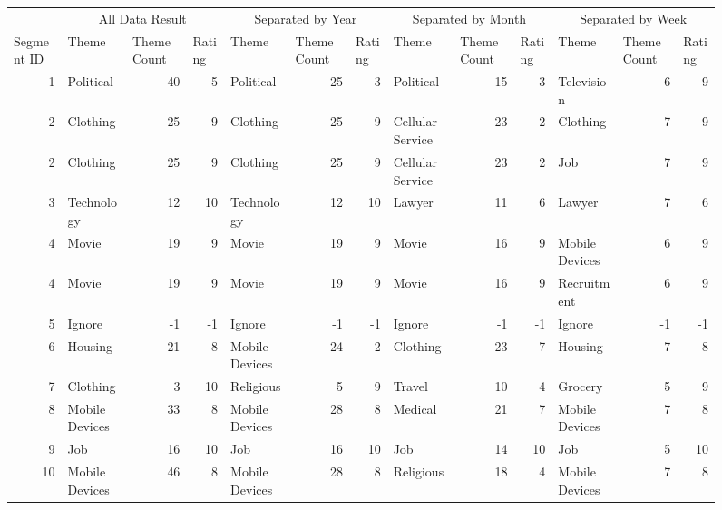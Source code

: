 \begin{figure}[htbp]
  \centering
    \begin{tabular}{rlrrlrrlrrlrr}
          & \multicolumn{3}{c}{All Data Result} & \multicolumn{3}{c}{Separated by Year} & \multicolumn{3}{c}{Separated by Month} & \multicolumn{3}{c}{Separated by Week} \\
    \multicolumn{1}{l}{Segment ID} & Theme & \multicolumn{1}{l}{Theme Count} & \multicolumn{1}{l}{Rating} & Theme & \multicolumn{1}{l}{Theme Count} & \multicolumn{1}{l}{Rating} & Theme & \multicolumn{1}{l}{Theme Count} & \multicolumn{1}{l}{Rating} & Theme & \multicolumn{1}{l}{Theme Count} & \multicolumn{1}{l}{Rating} \\
    1     & Political & 40    & 5     & Political & 25    & 3     & Political & 15    & 3     & Television & 6     & 9 \\
    2     & Clothing & 25    & 9     & Clothing & 25    & 9     & Cellular Service & 23    & 2     & Clothing & 7     & 9 \\
    2     & Clothing & 25    & 9     & Clothing & 25    & 9     & Cellular Service & 23    & 2     & Job   & 7     & 9 \\
    3     & Technology & 12    & 10    & Technology & 12    & 10    & Lawyer & 11    & 6     & Lawyer & 7     & 6 \\
    4     & Movie & 19    & 9     & Movie & 19    & 9     & Movie & 16    & 9     & Mobile Devices & 6     & 9 \\
    4     & Movie & 19    & 9     & Movie & 19    & 9     & Movie & 16    & 9     & Recruitment & 6     & 9 \\
    5     & Ignore & -1    & -1    & Ignore & -1    & -1    & Ignore & -1    & -1    & Ignore & -1    & -1 \\
    6     & Housing & 21    & 8     & Mobile Devices & 24    & 2     & Clothing & 23    & 7     & Housing & 7     & 8 \\
    7     & Clothing & 3     & 10    & Religious & 5     & 9     & Travel & 10    & 4     & Grocery & 5     & 9 \\
    8     & Mobile Devices & 33    & 8     & Mobile Devices & 28    & 8     & Medical & 21    & 7     & Mobile Devices & 7     & 8 \\
    9     & Job   & 16    & 10    & Job   & 16    & 10    & Job   & 14    & 10    & Job   & 5     & 10 \\
    10    & Mobile Devices & 46    & 8     & Mobile Devices & 28    & 8     & Religious & 18    & 4     & Mobile Devices & 7     & 8 \\

\end{tabular}
\end{figure}
